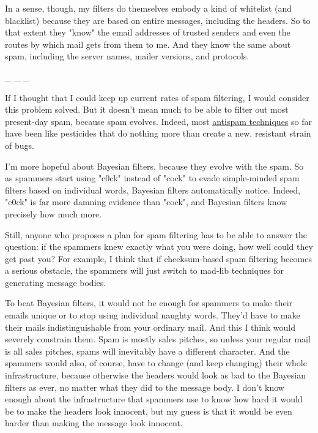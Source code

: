 In
                    a sense, though, my filters do themselves embody a kind of
                    whitelist (and blacklist) because they are based on entire
                    messages, including the headers. So to that extent they
                    "know" the email addresses of trusted senders and even the
                    routes by which mail gets from them to me. And they know the
                    same about spam, including the server names, mailer
                    versions, and protocols.


                    \_ \_ \_
                    

If I thought that I could keep up current rates
                    of spam filtering, I would consider this problem solved. But
                    it doesn't mean much to be able to filter out most
                    present-day spam, because spam evolves. Indeed, most
                    \href{http://www.paulgraham.com/falsepositives.html}{antispam techniques} so far
                    have been like pesticides that do nothing more than create a
                    new, resistant strain of bugs.

I'm more hopeful
                    about Bayesian filters, because they evolve with the spam.
                    So as spammers start using "c0ck" instead of "cock" to evade
                    simple-minded spam filters based on individual words,
                    Bayesian filters automatically notice. Indeed, "c0ck" is far
                    more damning evidence than "cock", and Bayesian filters know
                    precisely how much more.

Still, anyone who
                    proposes a plan for spam filtering has to be able to answer
                    the question: if the spammers knew exactly what you were
                    doing, how well could they get past you? For example, I
                    think that if checksum-based spam filtering becomes a
                    serious obstacle, the spammers will just switch to mad-lib
                    techniques for generating message bodies.

To beat
                    Bayesian filters, it would not be enough for spammers to
                    make their emails unique or to stop using individual naughty
                    words. They'd have to make their mails indistinguishable
                    from your ordinary mail. And this I think would severely
                    constrain them. Spam is mostly sales pitches, so unless your
                    regular mail is all sales pitches, spams will inevitably
                    have a different character. And the spammers would also, of
                    course, have to change (and keep changing) their whole
                    infrastructure, because otherwise the headers would look as
                    bad to the Bayesian filters as ever, no matter what they did
                    to the message body. I don't know enough about the
                    infrastructure that spammers use to know how hard it would
                    be to make the headers look innocent, but my guess is that
                    it would be even harder than making the message look
                    innocent.

